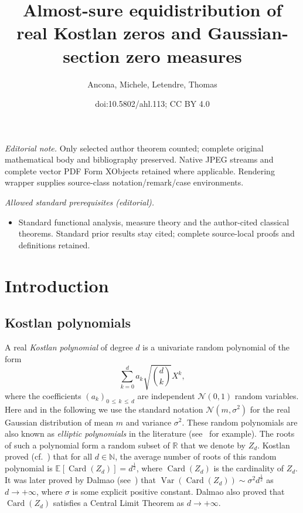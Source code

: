 \documentclass[10pt]{amsart}
\title{Almost-sure equidistribution of real Kostlan zeros and Gaussian-section zero measures}
\author{Ancona, Michele, Letendre, Thomas}
\date{doi:10.5802/ahl.113; CC BY 4.0}
\theoremstyle{definition}\newtheorem{defi}[theo]{Definition}\newtheorem{rema}[theo]{Remark}\newtheorem{exam}[theo]{Example}\newtheorem{exem}[theo]{Example}\newtheorem{nota}[theo]{Notation}
\DeclareMathOperator{\card}{Card}
\DeclareMathOperator{\Var}{Var}
\newcommand{\clN}{\mathcal{N}}
\newcommand{\N}{\mathbb{N}}
\newcommand{\R}{\mathbb{R}}
\newcommand{\esp}[2][]{\mathbb{E}_{#1}\!\left[#2 \right]}
\newcommand{\var}[1]{\Var\!\left(#1 \right)}
\renewcommand{\leq}{\leqslant}
\begin{document}
\maketitle
\noindent\textit{Editorial note.} Only selected author theorem counted; complete original mathematical body and bibliography preserved. Native JPEG streams and complete vector PDF Form XObjects retained where applicable. Rendering wrapper supplies source-class notation/remark/case environments.\par\medskip
\noindent\textit{Allowed standard prerequisites (editorial).}\begin{itemize}
\item Standard functional analysis, measure theory and the author-cited classical theorems. Standard prior results stay cited; complete source-local proofs and definitions retained.
\end{itemize}\medskip



\tableofcontents
\newpage


\section{Introduction}\label{sec introduction}

\subsection*{Kostlan polynomials}

A real \emph{Kostlan polynomial} of degree $d$ is a univariate random polynomial of the form
\[
\sum_{k=0}^d a_k \sqrt{\binom{d}{k}}X^k,
\]
where the coefficients $(a_k)_{0\,\leq\,k\,\leq\, d}$ are independent $\clN(0,1)$ random variables. Here and in the following we use the standard notation $\clN(m,\sigma^2)$ for the real Gaussian distribution of mean $m$ and variance $\sigma^2$. These random polynomials are also known as \emph{elliptic polynomials} in the literature (see~\cite{ST2004} for example). The roots of such a polynomial form a random subset of $\R$ that we denote by $Z_d$. Kostlan proved (cf.~\cite{Kos1993}) that for all $d \in \N$, the average number of roots of this random polynomial is $\esp{\card(Z_d)} = d^\frac{1}{2}$, where $\card(Z_d)$ is the cardinality of $Z_d$. It was later proved by Dalmao (see~\cite{Dal2015}) that $\var{\card(Z_d)} \sim \sigma^2 d^\frac{1}{2}$ as $d \to +\infty$, where $\sigma$ is some explicit positive constant. Dalmao also proved that $\card(Z_d)$ satisfies a Central Limit Theorem as $d \to +\infty$.
\end{document}
